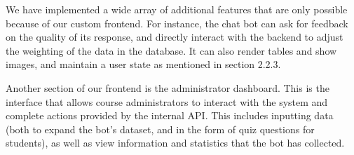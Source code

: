We have implemented a wide array of additional features that are only possible because of our custom frontend. For instance, the chat bot can ask for feedback on the quality of its response, and directly interact with the backend to adjust the weighting of the data in the database. It can also render tables and show images, and maintain a user state as mentioned in section 2.2.3.

Another section of our frontend is the administrator dashboard. This is the interface that allows course administrators to interact with the system and complete actions provided by the internal API. This includes inputting data (both to expand the bot's dataset, and in the form of quiz questions for students), as well as view information and statistics that the bot has collected.

\newpage
